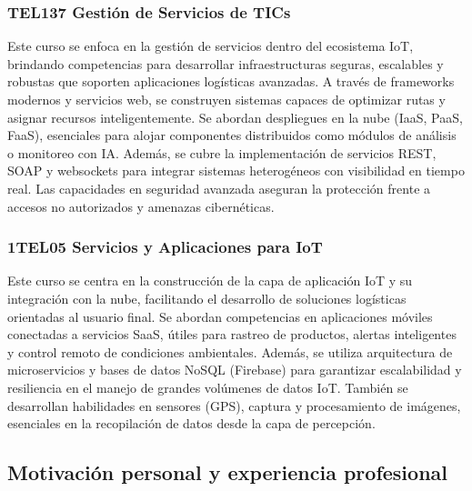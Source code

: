 \subsubsection{TEL137 Gestión de Servicios de TICs}

Este curso se enfoca en la gestión de servicios dentro del ecosistema IoT, brindando
competencias para desarrollar infraestructuras seguras, escalables y robustas que soporten aplicaciones logísticas avanzadas. A través de frameworks modernos y servicios web, se construyen sistemas capaces de optimizar rutas y asignar recursos inteligentemente. Se abordan despliegues en la nube (IaaS, PaaS, FaaS), esenciales para alojar componentes distribuidos como módulos de análisis o monitoreo con IA. Además, se cubre la implementación de
servicios REST, SOAP y websockets para integrar sistemas heterogéneos con visibilidad en tiempo real. Las capacidades en seguridad avanzada aseguran la protección frente a accesos no autorizados y amenazas cibernéticas.

\subsubsection{1TEL05 Servicios y Aplicaciones para IoT}

Este curso se centra en la construcción de la capa de aplicación IoT y su integración con la nube, facilitando el desarrollo de soluciones logísticas orientadas al usuario final. Se abordan competencias en aplicaciones móviles conectadas a servicios SaaS, útiles para rastreo de productos, alertas inteligentes y control remoto de condiciones ambientales. Además, se utiliza arquitectura de microservicios y bases de datos NoSQL (Firebase) para garantizar escalabilidad
y resiliencia en el manejo de grandes volúmenes de datos IoT. También se desarrollan
habilidades en sensores (GPS), captura y procesamiento de imágenes, esenciales en la
recopilación de datos desde la capa de percepción.
\subsection{Motivación personal y experiencia profesional}

